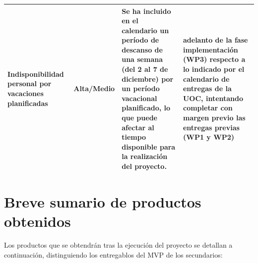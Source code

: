 \begin{table}[H]
\begin{tabularx}{\textwidth}{>{\raggedright\arraybackslash}p{2.8cm} c >{\raggedright\arraybackslash}X >{\raggedright\arraybackslash}X}
    \textbf{Indisponibilidad personal por vacaciones planificadas} & 
    Alta/Medio & 
    Se ha incluido en el calendario un período de descanso de una semana (del 2 al 7 de diciembre) por un período vacacional planificado, lo que puede afectar al tiempo disponible para la realización del proyecto. & 
    adelanto de la fase implementación (WP3) respecto a lo indicado por el calendario de entregas de la UOC, intentando completar con margen previo las entregas previas (WP1 y WP2) \\
    
    \bottomrule
  \end{tabularx}
\end{table}


\section{Breve sumario de productos obtenidos}

Los productos que se obtendrán tras la ejecución del proyecto se detallan a continuación, distinguiendo los entregablos del MVP de los secundarios:


